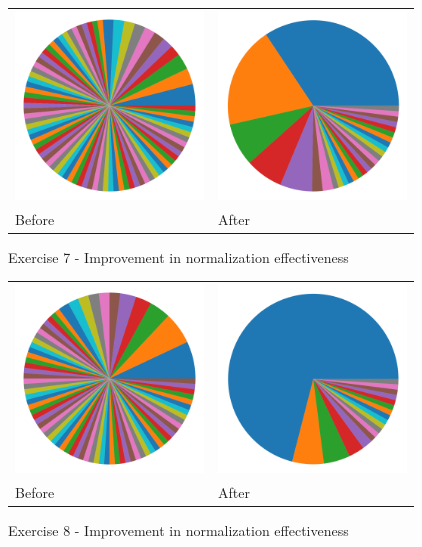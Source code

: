 \begin{figure}
\centering
\begin{tabular}{ >{\centering\arraybackslash}m{14em} >{\centering\arraybackslash}m{14em} }
\includegraphics[height=5cm]{graphs/cluster-baseline-7.png}
&
\includegraphics[height=5cm]{graphs/cluster-aggressive-7.png} \\
Before & After
\end{tabular}
\caption{Exercise 7 - Improvement in normalization effectiveness}
\label{fig:improvements-clusters-7}
\end{figure}

\begin{figure}
\centering
\begin{tabular}{ >{\centering\arraybackslash}m{14em} >{\centering\arraybackslash}m{14em} }
\includegraphics[height=5cm]{graphs/cluster-baseline-8.png}
&
\includegraphics[height=5cm]{graphs/cluster-aggressive-8.png} \\
Before & After
\end{tabular}
\caption{Exercise 8 - Improvement in normalization effectiveness}
\label{fig:improvements-clusters-8}
\end{figure}
